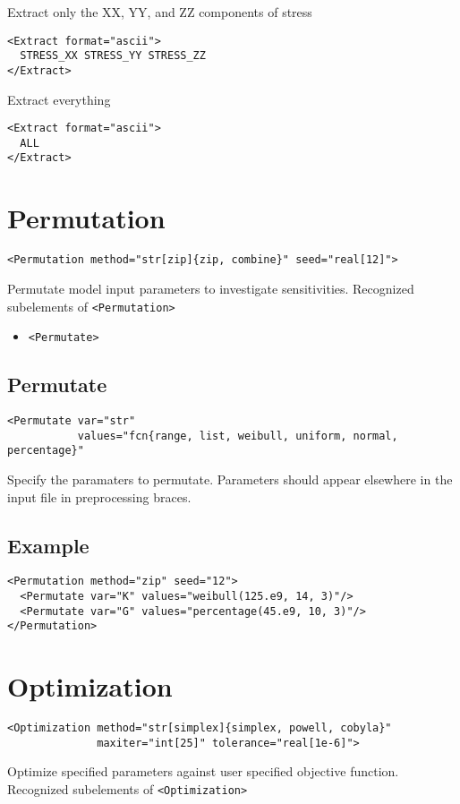\documentclass[11pt]{report}
\newcommand{\tag}[1]{\texttt{<#1>}}
\begin{document}
Extract only the XX, YY, and ZZ components of stress
%
\begin{verbatim}
<Extract format="ascii">
  STRESS_XX STRESS_YY STRESS_ZZ
</Extract>
\end{verbatim}

Extract everything
\begin{verbatim}
<Extract format="ascii">
  ALL
</Extract>
\end{verbatim}

\section{Permutation}
\begin{verbatim}
<Permutation method="str[zip]{zip, combine}" seed="real[12]">
\end{verbatim}
%
Permutate model input parameters to investigate sensitivities. Recognized
subelements of \tag{Permutation}

\begin{itemize}
  \item \tag{Permutate}
\end{itemize}

\subsection{Permutate}
\begin{verbatim}
<Permutate var="str"
           values="fcn{range, list, weibull, uniform, normal, percentage}"
\end{verbatim}
%
Specify the paramaters to permutate.  Parameters should appear elsewhere in
the input file in preprocessing braces.

\subsection{Example}
\begin{verbatim}
<Permutation method="zip" seed="12">
  <Permutate var="K" values="weibull(125.e9, 14, 3)"/>
  <Permutate var="G" values="percentage(45.e9, 10, 3)"/>
</Permutation>
\end{verbatim}


\section{Optimization}
\begin{verbatim}
<Optimization method="str[simplex]{simplex, powell, cobyla}"
              maxiter="int[25]" tolerance="real[1e-6]">
\end{verbatim}
%
Optimize specified parameters against user specified objective function.
Recognized subelements of \tag{Optimization}
\end{document}
